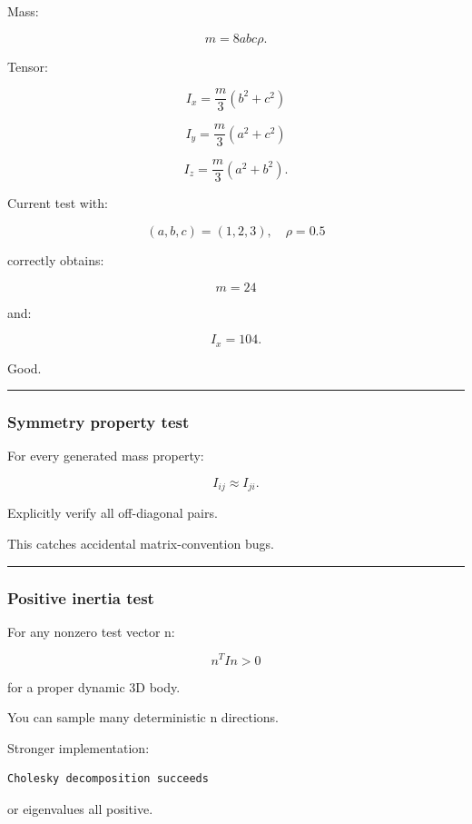 Mass:

\[
m=8abc\rho.
\]

Tensor:

\[
I_x
=
\frac m3(b^2+c^2)
\]

\[
I_y
=
\frac m3(a^2+c^2)
\]

\[
I_z
=
\frac m3(a^2+b^2).
\]

Current test with:

\[
(a,b,c)=(1,2,3),
\quad
\rho=0.5
\]

correctly obtains:

\[
m=24
\]

and:

\[
I_x=104.
\]

Good.

\begin{center}\rule{0.5\linewidth}{0.5pt}\end{center}

\subsubsection{Symmetry property test}\label{symmetry-property-test}

For every generated mass property:

\[
\boxed{
I_{ij}\approx I_{ji}.
}
\]

Explicitly verify all off-diagonal pairs.

This catches accidental matrix-convention bugs.

\begin{center}\rule{0.5\linewidth}{0.5pt}\end{center}

\subsubsection{Positive inertia test}\label{positive-inertia-test}

For any nonzero test vector n:

\[
\boxed{
n^TIn>0
}
\]

for a proper dynamic 3D body.

You can sample many deterministic n directions.

Stronger implementation:

\begin{verbatim}
Cholesky decomposition succeeds
\end{verbatim}

or eigenvalues all positive.

